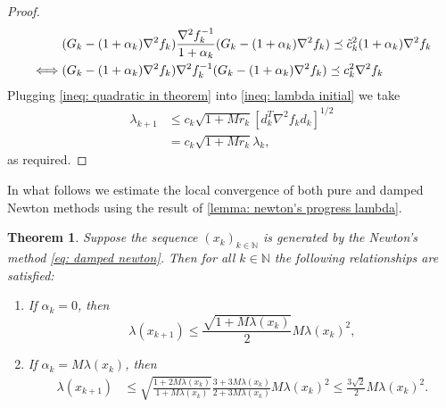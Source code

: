 \documentclass[sn-mathphys-num]{sn-jnl}%
\newcommand{\N}{\mathbb{N}}
\theoremstyle{thmstyleone}%
\newtheorem{theorem}{Theorem}[section]%
\theoremstyle{thmstyletwo}%
\theoremstyle{thmstylethree}%
\numberwithin{equation}{section}
\begin{document}
\begin{proof}
\begin{align}
        & (G_k - (1 + \alpha_k)\nabla^2 f_{k})  \frac{\nabla^2 f_k^{-1}}{1+\alpha_k} (G_k - (1 + \alpha_k)\nabla^2 f_{k}) \preceq \tilde{c}_k^2 (1 + \alpha_k)\nabla^2 f_k \notag \\
        \iff & (G_k - (1 + \alpha_k)\nabla^2 f_{k})  \nabla^2 f_k^{-1} (G_k - (1 + \alpha_k)\nabla^2 f_{k}) \preceq c_k^2 \nabla^2 f_k
    \end{align}
    Plugging \eqref{ineq: quadratic in theorem} into \eqref{ineq: lambda initial} we take
    \begin{align*}
        \lambda_{k+1} & \leq c_k \sqrt{1 + M r_k} \left[d_k^T \nabla^2 f_k d_k \right]^{1/2} \\
        & = c_k \sqrt{1 + M r_k} \lambda_k,
    \end{align*}
    as required.
\end{proof}

In what follows we estimate the local convergence of both pure and damped Newton methods using the result of \cref{lemma: newton's progress lambda}.

\begin{theorem} \label{thm: newton's rate}
Suppose the sequence $(x_k)_{k \in \N}$ is generated by the Newton's method \eqref{eq: damped newton}. Then for all $k \in \N$ the following relationships are satisfied:
\begin{enumerate}
    \item If $\alpha_k = 0$, then 
    \begin{equation}
            \lambda(x_{k+1}) \leq  \frac{\sqrt{1 + M \lambda(x_{k})}}{2} M \lambda(x_{k})^2, \label{ineq: pure newtons rate}
    \end{equation}
    \item If $\alpha_k = M \lambda(x_k)$, then 
    \begin{equation} \label{ineq: local rate damped newton}
    \begin{split}
        \lambda(x_{k+1}) & \leq \sqrt{\frac{1 + 2 M \lambda(x_{k})}{1 + M \lambda(x_{k})}} \frac{3 + 3 M \lambda(x_{k})}{2 + 3M \lambda(x_{k})} M \lambda(x_{k})^2  \leq \frac{3 \sqrt{2}}{2} M \lambda(x_{k})^2.
        \end{split}
    \end{equation}
\end{enumerate}
\end{theorem}
\end{document}
